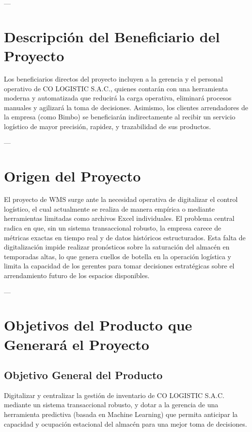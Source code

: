 \documentclass[11pt]{article}
\begin{document}
---

\section{Descripción del Beneficiario del Proyecto}

Los beneficiarios directos del proyecto incluyen a la gerencia y el personal operativo de CO LOGISTIC S.A.C., quienes contarán con una herramienta moderna y automatizada que reducirá la carga operativa, eliminará procesos manuales y agilizará la toma de decisiones. Asimismo, los clientes arrendadores de la empresa (como Bimbo) se beneficiarán indirectamente al recibir un servicio logístico de mayor precisión, rapidez, y trazabilidad de sus productos.

---

\section{Origen del Proyecto}

El proyecto de WMS surge ante la necesidad operativa de digitalizar el control logístico, el cual actualmente se realiza de manera empírica o mediante herramientas limitadas como archivos Excel individuales. El problema central radica en que, sin un sistema transaccional robusto, la empresa carece de métricas exactas en tiempo real y de datos históricos estructurados. Esta falta de digitalización impide realizar pronósticos sobre la saturación del almacén en temporadas altas, lo que genera cuellos de botella en la operación logística y limita la capacidad de los gerentes para tomar decisiones estratégicas sobre el arrendamiento futuro de los espacios disponibles.

---

\section{Objetivos del Producto que Generará el Proyecto}

\subsection{Objetivo General del Producto}
Digitalizar y centralizar la gestión de inventario de CO LOGISTIC S.A.C. mediante un sistema transaccional robusto, y dotar a la gerencia de una herramienta predictiva (basada en Machine Learning) que permita anticipar la capacidad y ocupación estacional del almacén para una mejor toma de decisiones.
\end{document}
